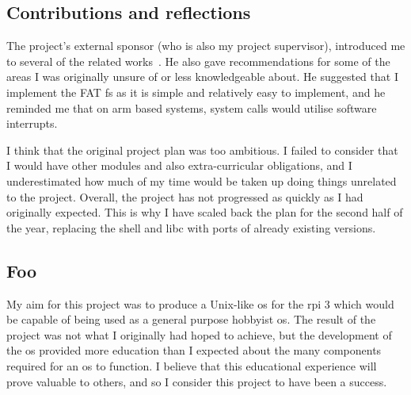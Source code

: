 \documentclass{article}
\begin{document}
\subsection{Contributions and reflections}

The project's external sponsor (who is also my project supervisor), introduced
me to several of the related works~\cite{netBSD-git, riscOS-source}. He also
gave recommendations for some of the areas I was originally unsure of or less
knowledgeable about. He suggested that I implement the FAT \gls{fs} as it is
simple and relatively easy to implement, and he reminded me that on \gls{arm}
based systems, system calls would utilise software interrupts.

I think that the original project plan was too ambitious. I failed to consider
that I would have other modules and also extra-curricular obligations, and I
underestimated how much of my time would be taken up doing things unrelated to
the project. Overall, the project has not progressed as quickly as I had
originally expected. This is why I have scaled back the plan for the second
half of the year, replacing the shell and libc with ports of already existing
versions.

\subsection{Foo}
My aim for this project was to produce a Unix-like \gls{os} for the \gls{rpi} 3
which would be capable of being used as a general purpose hobbyist \gls{os}.
The result of the project was not what I originally had hoped to achieve, but
the development of the \gls{os} provided more education than I expected about
the many components required for an \gls{os} to function. I believe that this
educational experience will prove valuable to others, and so I consider this
project to have been a success.
\end{document}
